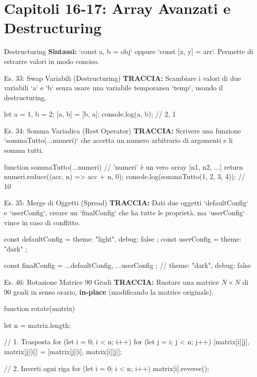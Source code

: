 \section{Capitoli 16-17: Array Avanzati e Destructuring}

\begin{dizionario}{Destructuring}
\textbf{Sintassi:} `const {a, b} = obj` oppure `const [x, y] = arr`.
Permette di estrarre valori in modo conciso.
\end{dizionario}

\begin{esercizio}{Es. 33: Swap Variabili (Destructuring)}
\textbf{TRACCIA:} Scambiare i valori di due variabili `a` e `b` senza usare una variabile temporanea `temp`, usando il destructuring.
\end{esercizio}

\begin{jsbox}
let a = 1, b = 2;
[a, b] = [b, a];
console.log(a, b); // 2, 1
\end{jsbox}

\begin{esercizio}{Es. 34: Somma Variadica (Rest Operator)}
\textbf{TRACCIA:} Scrivere una funzione `sommaTutto(...numeri)` che accetta un numero arbitrario di argomenti e li somma tutti.
\end{esercizio}

\begin{jsbox}
function sommaTutto(...numeri) {
    // 'numeri' è un vero array [n1, n2, ...]
    return numeri.reduce((acc, n) => acc + n, 0);
}
console.log(sommaTutto(1, 2, 3, 4)); // 10
\end{jsbox}

\begin{esercizio}{Es. 35: Merge di Oggetti (Spread)}
\textbf{TRACCIA:} Dati due oggetti `defaultConfig` e `userConfig`, creare un `finalConfig` che ha tutte le proprietà, ma `userConfig` vince in caso di conflitto.
\end{esercizio}

\begin{jsbox}
const defaultConfig = { theme: "light", debug: false };
const userConfig = { theme: "dark" };

const finalConfig = { ...defaultConfig, ...userConfig };
// { theme: "dark", debug: false }
\end{jsbox}

\begin{esercizio}{Es. 46: Rotazione Matrice 90 Gradi}
\textbf{TRACCIA:} Ruotare una matrice $N \times N$ di 90 gradi in senso orario, \textbf{in-place} (modificando la matrice originale).
\end{esercizio}

\begin{jsbox}
function rotate(matrix) {
    let n = matrix.length;
    
    // 1. Trasposta
    for (let i = 0; i < n; i++) {
        for (let j = i; j < n; j++) {
            [matrix[i][j], matrix[j][i]] = [matrix[j][i], matrix[i][j]];
        }
    }
    
    // 2. Inverti ogni riga
    for (let i = 0; i < n; i++) {
        matrix[i].reverse();
    }
}
\end{jsbox}
